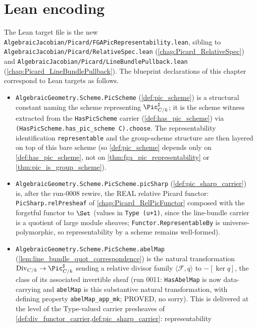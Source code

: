 \section{Lean encoding}
\label{sec:fga_pic_lean_encoding}

The Lean target file is the new
\texttt{AlgebraicJacobian/Picard/FGAPicRepresentability.lean}, sibling to
\texttt{AlgebraicJacobian/Picard/RelativeSpec.lean}
(\cref{chap:Picard_RelativeSpec}) and
\texttt{AlgebraicJacobian/Picard/LineBundlePullback.lean}
(\cref{chap:Picard_LineBundlePullback}). The blueprint declarations of
this chapter correspond to Lean targets as follows.

\begin{itemize}
  \item \texttt{AlgebraicGeometry.Scheme.PicScheme}
    (\cref{def:pic_scheme}) is a structural constant naming the scheme
    representing \(\Pic^\sharp_{C/k}\); it is the scheme witness
    extracted from the \texttt{HasPicScheme} carrier
    (\cref{def:has_pic_scheme}) via \texttt{(HasPicScheme.has\_pic\_scheme
    C).choose}. The representability identification \texttt{representable}
    and the group-scheme structure are then layered on top of this bare
    scheme (so \cref{def:pic_scheme} depends only on \cref{def:has_pic_scheme},
    not on \cref{thm:fga_pic_representability} or
    \cref{thm:pic_is_group_scheme}).
  \item \texttt{AlgebraicGeometry.Scheme.PicScheme.picSharp}
    (\cref{def:pic_sharp_carrier}) is, after the run-0008 rewire, the REAL
    relative Picard functor: \texttt{PicSharp.relPresheaf} of
    \cref{chap:Picard_RelPicFunctor} composed with the forgetful functor
    to \(\Set\) (values in \texttt{Type (u+1)}, since the line-bundle
    carrier is a quotient of large module sheaves;
    \texttt{Functor.RepresentableBy} is universe-polymorphic, so
    representability by a scheme remains well-formed).
  \item \texttt{AlgebraicGeometry.Scheme.PicScheme.abelMap}
    (\cref{lem:line_bundle_quot_correspondence}) is the natural
    transformation \(\mathrm{Div}_{C/k} \to \Pic^\sharp_{C/k}\) sending a
    relative divisor family \(\langle \mathcal F, q\rangle\) to
    \(-[\ker q]\), the class of its associated invertible sheaf
    (run 0011: \texttt{HasAbelMap} is now data-carrying and
    \texttt{abelMap} is this substantive natural transformation, with
    defining property \texttt{abelMap\_app\_mk}; PROVED, no sorry). This
    is delivered at the level of the Type-valued carrier presheaves of
    \cref{def:div_functor_carrier,def:pic_sharp_carrier}: representability

\end{itemize}
